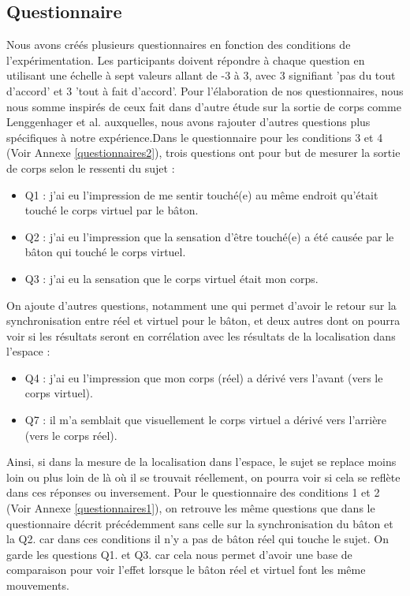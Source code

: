 \subsection{Questionnaire}
Nous avons créés plusieurs questionnaires en fonction des conditions de l'expérimentation. Les participants doivent répondre à chaque question en utilisant une échelle à sept valeurs allant de -3 à 3, avec 3 signifiant 'pas du tout d'accord' et 3 'tout à fait d'accord'. Pour l'élaboration de nos questionnaires, nous nous somme inspirés de ceux fait dans d'autre étude sur la sortie de corps comme Lenggenhager et al. \cite{le07} auxquelles, nous avons rajouter d'autres questions plus spécifiques à notre expérience.Dans le questionnaire pour les conditions 3 et 4 (Voir Annexe \ref{questionnaires2}), trois questions ont pour but de mesurer la sortie de corps selon le ressenti du sujet :
\begin{itemize}
\item Q1 : j'ai eu l'impression de me sentir touché(e) au même endroit qu'était touché le corps virtuel par le bâton.
\item Q2 : j'ai eu l'impression que la sensation d'être touché(e) a été causée par le bâton qui touché le corps virtuel.
\item Q3 : j'ai eu la sensation que le corps virtuel était mon corps.
\end{itemize}

On ajoute d'autres questions, notamment une qui permet d'avoir le retour sur la synchronisation entre réel et virtuel pour le bâton, et deux autres dont on pourra voir si les résultats seront en corrélation avec les résultats de la localisation dans l'espace : 
\begin{itemize}
\item Q4 : j'ai eu l'impression que mon corps (réel) a dérivé vers l'avant (vers le corps virtuel).
\item Q7 : il m'a semblait que visuellement le corps virtuel a dérivé vers l'arrière (vers le corps réel).
\end{itemize}
Ainsi, si dans la mesure de la localisation dans l'espace, le sujet se replace moins loin ou plus loin de là où il se trouvait réellement, on pourra voir si cela se reflète dans ces réponses ou inversement. Pour le questionnaire des conditions 1 et 2 (Voir Annexe \ref{questionnaires1}), on retrouve les même questions que dans le questionnaire décrit précédemment sans celle sur la synchronisation du bâton et la Q2. car dans ces conditions il n'y a pas de bâton réel qui touche le sujet. On garde les questions Q1. et Q3. car cela nous permet d'avoir une base de comparaison pour voir l'effet lorsque le bâton réel et virtuel font les même mouvements.\\

